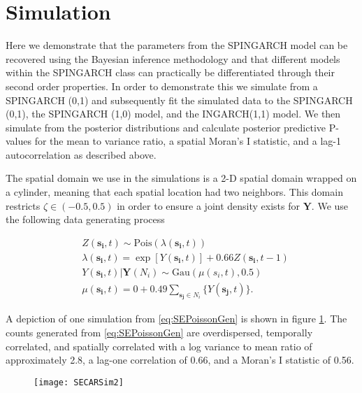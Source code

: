 \documentclass[11pt]{isuthesis}
\begin{document}
\section{Simulation}\label{Sec:Sim}

Here we demonstrate that the parameters from the SPINGARCH model can be recovered using the Bayesian inference methodology and that different models within the SPINGARCH class can practically be differentiated through their second order properties.  In order to demonstrate this we simulate from a SPINGARCH (0,1) and subsequently fit the simulated data to the SPINGARCH (0,1), the SPINGARCH (1,0) model, and the INGARCH(1,1) model.  We then simulate from the posterior distributions and calculate posterior predictive P-values for the mean to variance ratio, a spatial Moran's I statistic, and a lag-1 autocorrelation as described above.

The spatial domain we use in the simulations is a 2-D spatial domain wrapped on a cylinder, meaning that each spatial location had two neighbors.  This domain restricts $\zeta \in (-0.5,0.5)$ in order to ensure a joint density exists for $\boldsymbol{Y}$.  We use the following data generating process

\begin{align}
	& Z(\boldsymbol{s_i},t)  \sim\mbox{Pois}(\lambda(\boldsymbol{s_i},t))\nonumber\\
	& \lambda(\boldsymbol{s_i},t) =\exp \left[ Y(\boldsymbol{s_i},t) \right] + 0.66 Z(\boldsymbol{s_i},t-1)\nonumber\\
	& Y(\boldsymbol{s_i},t)|\boldsymbol{Y}(N_i)  \sim \mbox{Gau}(\mu(s_i,t),0.5)\nonumber\\ 
	& \mu(\boldsymbol{s_i},t)  = 0+ 0.49 \sum_{\boldsymbol{s_j} \in N_i} \{Y(\boldsymbol{s_j},t)\}\label{eq:SEPoissonGen}.
\end{align}

A depiction of one simulation from \eqref{eq:SEPoissonGen} is shown in figure \ref{fig:SEPoissonGen}.  The counts generated from \eqref{eq:SEPoissonGen} are overdispersed, temporally correlated, and spatially correlated  with a log variance to mean ratio of approximately 2.8, a lag-one correlation of 0.66, and a Moran's I statistic of 0.56.


\begin{figure}[!htp]
	\centering
	\texttt{[image: SECARSim2]}
	\label{fig:SEPoissonGen}
\end{figure}
\end{document}
